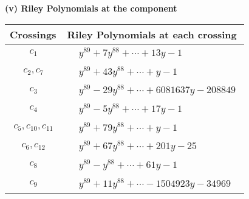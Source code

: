 \documentclass[1p]{elsarticle_modified}
\theoremstyle{definition}
\begin{document}
\newpage\renewcommand{\arraystretch}{1}
\flushleft \textbf{(v) Riley Polynomials at the component}\newline \\
\begin{tabular}{m{50pt}|m{274pt}}
Crossings & \hspace{64pt}Riley Polynomials at each crossing \\
\hline $$\begin{aligned}c_{1}\end{aligned}$$&$\begin{aligned}
&y^{89}+7 y^{88}+\cdots+13 y-1
\end{aligned}$\\
\hline $$\begin{aligned}c_{2},c_{7}\end{aligned}$$&$\begin{aligned}
&y^{89}+43 y^{88}+\cdots+y-1
\end{aligned}$\\
\hline $$\begin{aligned}c_{3}\end{aligned}$$&$\begin{aligned}
&y^{89}-29 y^{88}+\cdots+6081637 y-208849
\end{aligned}$\\
\hline $$\begin{aligned}c_{4}\end{aligned}$$&$\begin{aligned}
&y^{89}-5 y^{88}+\cdots+17 y-1
\end{aligned}$\\
\hline $$\begin{aligned}c_{5},c_{10},c_{11}\end{aligned}$$&$\begin{aligned}
&y^{89}+79 y^{88}+\cdots+y-1
\end{aligned}$\\
\hline $$\begin{aligned}c_{6},c_{12}\end{aligned}$$&$\begin{aligned}
&y^{89}+67 y^{88}+\cdots+201 y-25
\end{aligned}$\\
\hline $$\begin{aligned}c_{8}\end{aligned}$$&$\begin{aligned}
&y^{89}- y^{88}+\cdots+61 y-1
\end{aligned}$\\
\hline $$\begin{aligned}c_{9}\end{aligned}$$&$\begin{aligned}
&y^{89}+11 y^{88}+\cdots-1504923 y-34969
\end{aligned}$\\
\hline
\end{tabular}\\~\\
\end{document}
